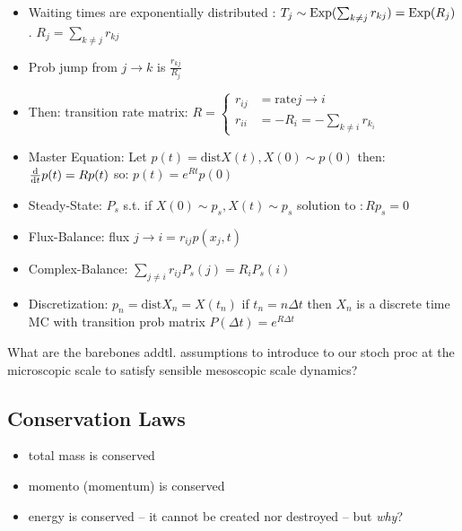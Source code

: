 \begin{itemize}
    \item Waiting times are exponentially distributed : $T_j \sim \text{Exp}(\sum_{k\neq j} r_{kj})=\text{Exp}(R_j)$.
    $R_j = \sum_{k \neq j} r_{kj}$

    \item Prob jump from $j \rightarrow k$ is $ \frac{r_{kj}}{R_j}$

    \item Then: transition rate matrix: $R = 
    \begin{cases}
        r_{ij} &= \mathrm{rate } j \rightarrow i \\
        r_{ii} &= -R_i = - \sum_{k \neq i} r_{k_i}
    \end{cases}
    $

    \item Master Equation: Let $p(t) = \mathrm{dist } X(t), X(0) \sim p(0)$ then: $ \frac{\mathrm d{}}{\mathrm d{t}}p(t) = Rp(t)$ so: $p(t) = e^{Rt} p(0)$

    \item Steady-State: $P_s$ s.t. if $X(0) \sim p_s, X(t) \sim p_s$ solution to $: Rp_s = 0$

    \item Flux-Balance: flux $j \rightarrow i = r_{ij} p(x_j, t)$

    \item Complex-Balance: $ \sum_{j \neq i} r_{ij} P_s(j) = R_i P_s(i) $

    \item Discretization: $p_n = \mathrm{dist } X_n = X(t_n)$
    if $t_n = n \Delta t$ then $X_n$ is a discrete time MC with transition prob matrix $P(\Delta t) = e^{R \Delta t}$
\end{itemize}

\begin{shaded}
What are the barebones addtl. assumptions to introduce to our stoch proc at the microscopic scale to satisfy sensible mesoscopic scale dynamics?
\end{shaded}

\subsection{Conservation Laws}
\begin{itemize}
    \item total mass is conserved
    \item momento (momentum) is conserved
    \item energy is conserved -- it cannot be created nor destroyed -- but \textit{why}? 
\end{itemize}

